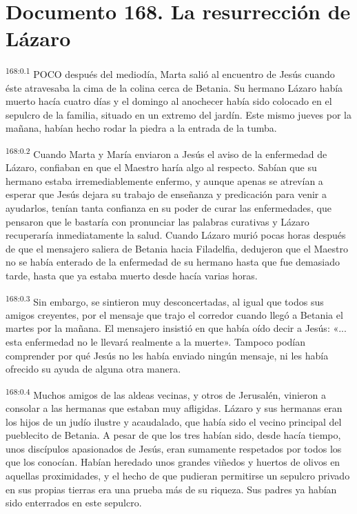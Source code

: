 \chapter{Documento 168. La resurrección de Lázaro}
\par 
\textsuperscript{168:0.1} POCO después del mediodía, Marta salió al encuentro de Jesús cuando éste atravesaba la cima de la colina cerca de Betania. Su hermano Lázaro había muerto hacía cuatro días y el domingo al anochecer había sido colocado en el sepulcro de la familia, situado en un extremo del jardín. Este mismo jueves por la mañana, habían hecho rodar la piedra a la entrada de la tumba.

\par 
\textsuperscript{168:0.2} Cuando Marta y María enviaron a Jesús el aviso de la enfermedad de Lázaro, confiaban en que el Maestro haría algo al respecto. Sabían que su hermano estaba irremediablemente enfermo, y aunque apenas se atrevían a esperar que Jesús dejara su trabajo de enseñanza y predicación para venir a ayudarlos, tenían tanta confianza en su poder de curar las enfermedades, que pensaron que le bastaría con pronunciar las palabras curativas y Lázaro recuperaría inmediatamente la salud. Cuando Lázaro murió pocas horas después de que el mensajero saliera de Betania hacia Filadelfia, dedujeron que el Maestro no se había enterado de la enfermedad de su hermano hasta que fue demasiado tarde, hasta que ya estaba muerto desde hacía varias horas.

\par 
\textsuperscript{168:0.3} Sin embargo, se sintieron muy desconcertadas, al igual que todos sus amigos creyentes, por el mensaje que trajo el corredor cuando llegó a Betania el martes por la mañana. El mensajero insistió en que había oído decir a Jesús: «... esta enfermedad no le llevará realmente a la muerte». Tampoco podían comprender por qué Jesús no les había enviado ningún mensaje, ni les había ofrecido su ayuda de alguna otra manera.

\par 
\textsuperscript{168:0.4} Muchos amigos de las aldeas vecinas, y otros de Jerusalén, vinieron a consolar a las hermanas que estaban muy afligidas. Lázaro y sus hermanas eran los hijos de un judío ilustre y acaudalado, que había sido el vecino principal del pueblecito de Betania. A pesar de que los tres habían sido, desde hacía tiempo, unos discípulos apasionados de Jesús, eran sumamente respetados por todos los que los conocían. Habían heredado unos grandes viñedos y huertos de olivos en aquellas proximidades, y el hecho de que pudieran permitirse un sepulcro privado en sus propias tierras era una prueba más de su riqueza. Sus padres ya habían sido enterrados en este sepulcro.

